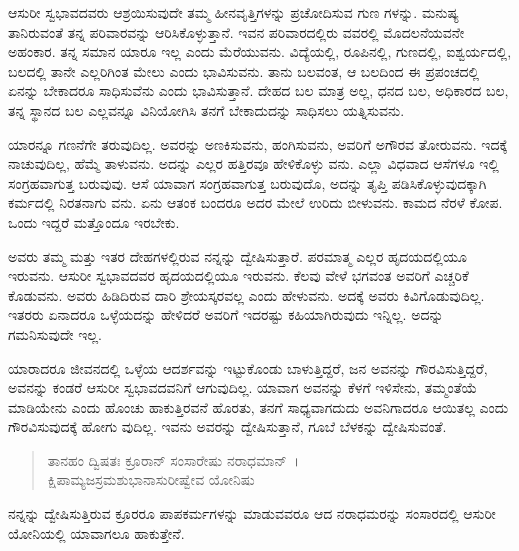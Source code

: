 ಆಸುರೀ ಸ್ವಭಾವದವರು ಆಶ್ರಯಿಸುವುದೇ ತಮ್ಮ ಹೀನವೃತ್ತಿಗಳನ್ನು ಪ್ರಚೋದಿಸುವ ಗುಣ ಗಳನ್ನು. ಮನುಷ್ಯ ತಾನಿರುವಂತೆ ತನ್ನ ಪರಿವಾರವನ್ನು ಆರಿಸಿಕೊಳ್ಳುತ್ತಾನೆ. ಇವನ ಪರಿವಾರದಲ್ಲಿರು ವವರಲ್ಲಿ ಮೊದಲನೆಯವನೇ ಅಹಂಕಾರ. ತನ್ನ ಸಮಾನ ಯಾರೂ ಇಲ್ಲ ಎಂದು ಮೆರೆಯುವನು. ವಿದ್ಯೆಯಲ್ಲಿ, ರೂಪಿನಲ್ಲಿ, ಗುಣದಲ್ಲಿ, ಐಶ್ವರ್ಯದಲ್ಲಿ, ಬಲದಲ್ಲಿ ತಾನೇ ಎಲ್ಲರಿಗಿಂತ ಮೇಲು ಎಂದು ಭಾವಿಸುವನು. ತಾನು ಬಲವಂತ, ಆ ಬಲದಿಂದ ಈ ಪ್ರಪಂಚದಲ್ಲಿ ಏನನ್ನು ಬೇಕಾದರೂ ಸಾಧಿಸುವೆನು ಎಂದು ಭಾವಿಸುತ್ತಾನೆ. ದೇಹದ ಬಲ ಮಾತ್ರ ಅಲ್ಲ, ಧನದ ಬಲ, ಅಧಿಕಾರದ ಬಲ, ತನ್ನ ಸ್ಥಾನದ ಬಲ ಎಲ್ಲವನ್ನೂ ವಿನಿಯೋಗಿಸಿ ತನಗೆ ಬೇಕಾದುದನ್ನು ಸಾಧಿಸಲು ಯತ್ನಿಸುವನು.

ಯಾರನ್ನೂ ಗಣನೆಗೇ ತರುವುದಿಲ್ಲ. ಅವರನ್ನು ಅಣಕಿಸುವನು, ಹಂಗಿಸುವನು, ಅವರಿಗೆ ಅಗೌರವ ತೋರುವನು. ಇದಕ್ಕೆ ನಾಚುವುದಿಲ್ಲ, ಹೆಮ್ಮೆ ತಾಳುವನು. ಅದನ್ನು ಎಲ್ಲರ ಹತ್ತಿರವೂ ಹೇಳಿಕೊಳ್ಳು ವನು. ಎಲ್ಲಾ ವಿಧವಾದ ಆಸೆಗಳೂ ಇಲ್ಲಿ ಸಂಗ್ರಹವಾಗುತ್ತ ಬರುವುವು. ಆಸೆ ಯಾವಾಗ ಸಂಗ್ರಹವಾಗುತ್ತ ಬರುವುದೊ, ಅದನ್ನು ತೃಪ್ತಿ ಪಡಿಸಿಕೊಳ್ಳುವುದಕ್ಕಾಗಿ ಕರ್ಮದಲ್ಲಿ ನಿರತನಾಗು ವನು. ಏನು ಆತಂಕ ಬಂದರೂ ಅದರ ಮೇಲೆ ಉರಿದು ಬೀಳುವನು. ಕಾಮದ ನೆರಳೆ ಕೋಪ. ಒಂದು ಇದ್ದರೆ ಮತ್ತೊಂದೂ ಇರಬೇಕು.

ಅವರು ತಮ್ಮ ಮತ್ತು ಇತರ ದೇಹಗಳಲ್ಲಿರುವ ನನ್ನನ್ನು ದ್ವೇಷಿಸುತ್ತಾರೆ. ಪರಮಾತ್ಮ ಎಲ್ಲರ ಹೃದಯದಲ್ಲಿಯೂ ಇರುವನು. ಆಸುರೀ ಸ್ವಭಾವದವರ ಹೃದಯದಲ್ಲಿಯೂ ಇರುವನು. ಕೆಲವು ವೇಳೆ ಭಗವಂತ ಅವರಿಗೆ ಎಚ್ಚರಿಕೆ ಕೊಡುವನು. ಅವರು ಹಿಡಿದಿರುವ ದಾರಿ ಶ್ರೇಯಸ್ಕರವಲ್ಲ ಎಂದು ಹೇಳುವನು. ಅದಕ್ಕೆ ಅವರು ಕಿವಿಗೊಡುವುದಿಲ್ಲ. ಇತರರು ಏನಾದರೂ ಒಳ್ಳೆಯದನ್ನು ಹೇಳಿದರೆ ಅವರಿಗೆ ಇದರಷ್ಟು ಕಹಿಯಾಗಿರುವುದು ಇನ್ನಿಲ್ಲ. ಅದನ್ನು ಗಮನಿಸುವುದೇ ಇಲ್ಲ.

ಯಾರಾದರೂ ಜೀವನದಲ್ಲಿ ಒಳ್ಳೆಯ ಆದರ್ಶವನ್ನು ಇಟ್ಟುಕೊಂಡು ಬಾಳುತ್ತಿದ್ದರೆ, ಜನ ಅವನನ್ನು ಗೌರವಿಸುತ್ತಿದ್ದರೆ, ಅವನನ್ನು ಕಂಡರೆ ಆಸುರೀ ಸ್ವಭಾವದವನಿಗೆ ಆಗುವುದಿಲ್ಲ. ಯಾವಾಗ ಅವನನ್ನು ಕೆಳಗೆ ಇಳಿಸೇನು, ತಮ್ಮಂತೆಯೆ ಮಾಡಿಯೇನು ಎಂದು ಹೊಂಚು ಹಾಕುತ್ತಿರವನೆ ಹೊರತು, ತನಗೆ ಸಾಧ್ಯವಾಗದುದು ಅವನಿಗಾದರೂ ಆಯಿತಲ್ಲ ಎಂದು ಗೌರವಿಸುವುದಕ್ಕೆ ಹೋಗು ವುದಿಲ್ಲ. ಇವನು ಅವರನ್ನು ದ್ವೇಷಿಸುತ್ತಾನೆ, ಗೂಬೆ ಬೆಳಕನ್ನು ದ್ವೇಷಿಸುವಂತೆ.

\begin{verse}
ತಾನಹಂ ದ್ವಿಷತಃ ಕ್ರೂರಾನ್ ಸಂಸಾರೇಷು ನರಾಧಮಾನ್~।\\ಕ್ಷಿಪಾಮ್ಯಜಸ್ರಮಶುಭಾನಾಸುರೀಷ್ವೇವ ಯೋನಿಷು 
\end{verse}

{\small ನನ್ನನ್ನು ದ್ವೇಷಿಸುತ್ತಿರುವ ಕ್ರೂರರೂ ಪಾಪಕರ್ಮಗಳನ್ನು ಮಾಡುವವರೂ ಆದ ನರಾಧಮರನ್ನು ಸಂಸಾರದಲ್ಲಿ ಆಸುರೀ ಯೋನಿಯಲ್ಲಿ ಯಾವಾಗಲೂ ಹಾಕುತ್ತೇನೆ.}

